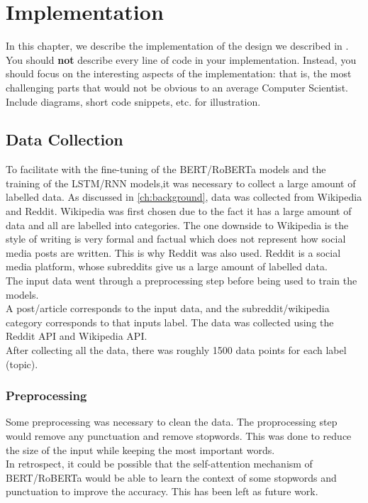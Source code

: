 \chapter{Implementation}
\label{ch:implementation}

In this chapter, we describe the implementation of the design we described in . You should \textbf{not} describe every line of code in your implementation. Instead, you should focus on the interesting aspects of the implementation: that is, the most challenging parts that would not be obvious to an average Computer Scientist. Include diagrams, short code snippets, etc. for illustration. 

\section{Data Collection}
To facilitate with the fine-tuning of the BERT/RoBERTa models and the training of the LSTM/RNN models,it was necessary to collect
a large amount of labelled data. As discussed in \ref{ch:background}, data was collected from Wikipedia and Reddit. Wikipedia was first
chosen due to the fact it has a large amount of data and all are labelled into categories. The one downside to Wikipedia is the style
of writing is very formal and factual which does not represent how social media posts are written. This is why Reddit was also used.
Reddit is a social media platform, whose subreddits give us a large amount of labelled data.\\
The input data went through a preprocessing step before being used to train the models.\\
A post/article corresponds to the input data, and the subreddit/wikipedia category corresponds to that inputs label. The data was collected
using the Reddit API and Wikipedia API.\\
After collecting all the data, there was roughly 1500 data points for each label (topic).
\subsection{Preprocessing}
Some preprocessing was necessary to clean the data. The proprocessing step would remove any punctuation and remove stopwords. This was done
to reduce the size of the input while keeping the most important words.\\
In retrospect, it could be possible that the self-attention mechanism of BERT/RoBERTa would be able to learn the context of some stopwords
and punctuation to improve the accuracy. This has been left as future work.
